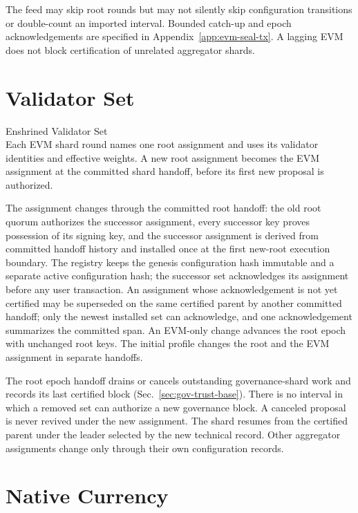 The feed may skip root rounds but may not silently skip configuration transitions or double-count an imported interval. Bounded catch-up and epoch acknowledgements are specified in Appendix~\ref{app:evm-seal-tx}. A lagging EVM does not block certification of unrelated aggregator shards.

\section{Validator Set}\label{sec:evm-validators}

\begin{ruledef*}{Enshrined Validator Set} \\
 Each EVM shard round names one root assignment and uses its validator identities and effective weights. A new root assignment becomes the EVM assignment at the committed shard handoff, before its first new proposal is authorized.
\end{ruledef*}

The assignment changes through the committed root handoff: the old root quorum authorizes the successor assignment, every successor key proves possession of its signing key, and the successor assignment is derived from committed handoff history and installed once at the first new-root execution boundary. The registry keeps the genesis configuration hash immutable and a separate active configuration hash; the successor set acknowledges its assignment before any user transaction. An assignment whose acknowledgement is not yet certified may be superseded on the same certified parent by another committed handoff; only the newest installed set can acknowledge, and one acknowledgement summarizes the committed span. An EVM-only change advances the root epoch with unchanged root keys. The initial profile changes the root and the EVM assignment in separate handoffs.

The root epoch handoff drains or cancels outstanding governance-shard work and records its last certified block (Sec.~\ref{sec:gov-trust-base}). There is no interval in which a removed set can authorize a new governance block. A canceled proposal is never revived under the new assignment. The shard resumes from the certified parent under the leader selected by the new technical record. Other aggregator assignments change only through their own configuration records.

\section{Native Currency}\label{sec:evm-native-currency}

